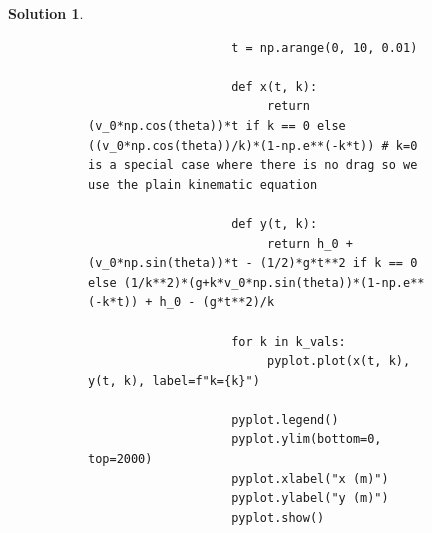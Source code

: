 \documentclass[10pt]{article}
\theoremstyle{definition}
\newtheorem{soln}{Solution}
\begin{document}
\begin{soln}
\begin{figure}[h]
\begin{subfigure}[t]{0.49\textwidth}
\begin{verbatim}
                    t = np.arange(0, 10, 0.01)

                    def x(t, k):
                         return (v_0*np.cos(theta))*t if k == 0 else ((v_0*np.cos(theta))/k)*(1-np.e**(-k*t)) # k=0 is a special case where there is no drag so we use the plain kinematic equation

                    def y(t, k):
                         return h_0 + (v_0*np.sin(theta))*t - (1/2)*g*t**2 if k == 0 else (1/k**2)*(g+k*v_0*np.sin(theta))*(1-np.e**(-k*t)) + h_0 - (g*t**2)/k

                    for k in k_vals:
                         pyplot.plot(x(t, k), y(t, k), label=f"k={k}")
    
                    pyplot.legend()
                    pyplot.ylim(bottom=0, top=2000)
                    pyplot.xlabel("x (m)")
                    pyplot.ylabel("y (m)")
                    pyplot.show()
               \end{verbatim}
          \end{subfigure}%
     \end{figure}
\end{soln}
\end{document}
